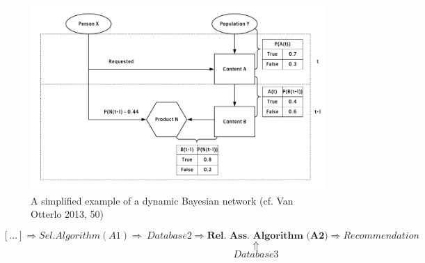 \documentclass[12pt,twoside]{report}
\begin{document}
\begin{figure}

{\centering \includegraphics{Bay} 

}

\caption{A simplified example of a dynamic Bayesian network (cf. Van Otterlo 2013, 50)}\label{fig:Bay}
\end{figure}

\newpage

\[ [...] \Rightarrow Sel. Algorithm (A1) \Rightarrow \ Database 2 \Rightarrow \textbf{Rel. Ass. Algorithm (A2)} \Rightarrow Recommendation\]
\[   \qquad \qquad \qquad \qquad \qquad  \qquad \qquad \qquad \Uparrow \]
\[ \qquad \qquad \qquad \qquad  \qquad \qquad \qquad \qquad Database 3 \]
\end{document}
